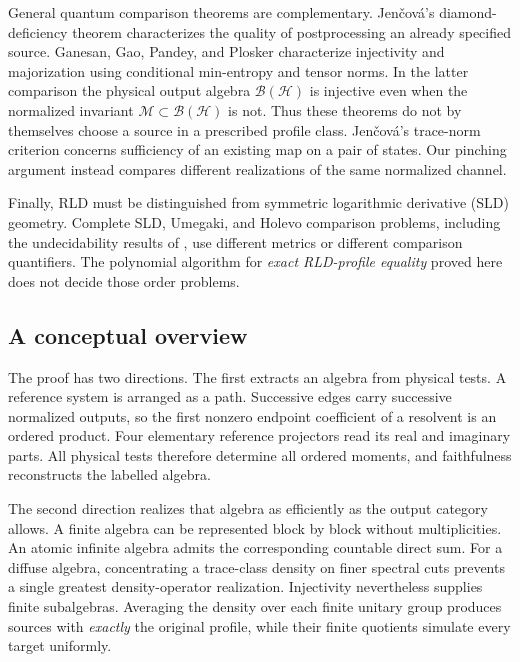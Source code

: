 \documentclass[11pt,reqno]{amsart}
\theoremstyle{definition}
\theoremstyle{remark}
\numberwithin{equation}{section}
\newcommand{\M}{\mathcal M}
\newcommand{\HH}{\mathcal H}
\newcommand{\B}{\mathcal B}
\begin{document}
General quantum comparison theorems are complementary. Jen\v cov\'a's diamond-deficiency theorem \cite[Theorem~1]{JencovaComparison} characterizes the quality of postprocessing an already specified source. Ganesan, Gao, Pandey, and Plosker \cite[Theorems~3.5, 3.13, and 3.18]{Ganesan} characterize injectivity and majorization using conditional min-entropy and tensor norms. In the latter comparison the physical output algebra $\B(\HH)$ is injective even when the normalized invariant $\M\subset\B(\HH)$ is not. Thus these theorems do not by themselves choose a source in a prescribed profile class. Jen\v cov\'a's trace-norm criterion \cite[Theorem~4]{JencovaRecovery} concerns sufficiency of an existing map on a pair of states. Our pinching argument instead compares different realizations of the same normalized channel.

Finally, RLD must be distinguished from symmetric logarithmic derivative (SLD) geometry. Complete SLD, Umegaki, and Holevo comparison problems, including the undecidability results of \cite{CompleteOrders}, use different metrics or different comparison quantifiers. The polynomial algorithm for \emph{exact RLD-profile equality} proved here does not decide those order problems.

\clearpage
\subsection{A conceptual overview}

The proof has two directions. The first extracts an algebra from physical tests. A reference system is arranged as a path. Successive edges carry successive normalized outputs, so the first nonzero endpoint coefficient of a resolvent is an ordered product. Four elementary reference projectors read its real and imaginary parts. All physical tests therefore determine all ordered moments, and faithfulness reconstructs the labelled algebra.

The second direction realizes that algebra as efficiently as the output category allows. A finite algebra can be represented block by block without multiplicities. An atomic infinite algebra admits the corresponding countable direct sum. For a diffuse algebra, concentrating a trace-class density on finer spectral cuts prevents a single greatest density-operator realization. Injectivity nevertheless supplies finite subalgebras. Averaging the density over each finite unitary group produces sources with \emph{exactly} the original profile, while their finite quotients simulate every target uniformly.
\end{document}
